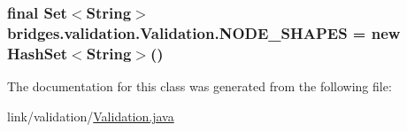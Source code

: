 \subsubsection[{N\+O\+D\+E\+\_\+\+S\+H\+A\+P\+E\+S}]{\setlength{\rightskip}{0pt plus 5cm}final Set$<$String$>$ bridges.\+validation.\+Validation.\+N\+O\+D\+E\+\_\+\+S\+H\+A\+P\+E\+S = new Hash\+Set$<$String$>$()\hspace{0.3cm}{\ttfamily [static]}}\label{classbridges_1_1validation_1_1_validation_a43f1f9efc20d0086b7fcfa9b40bd7146}


The documentation for this class was generated from the following file\+:\begin{DoxyCompactItemize}
\item 
link/validation/\hyperlink{_validation_8java}{Validation.\+java}\end{DoxyCompactItemize}
